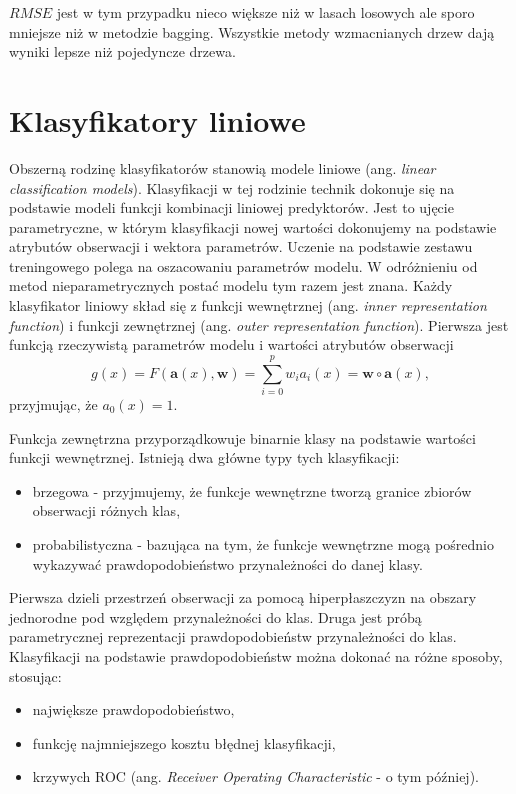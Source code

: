\documentclass[
]{book}
\providecommand{\tightlist}{%
  \setlength{\itemsep}{0pt}\setlength{\parskip}{0pt}}
\theoremstyle{plain}
\theoremstyle{definition}
\theoremstyle{definition}
\theoremstyle{definition}
\theoremstyle{definition}
\theoremstyle{definition}
\theoremstyle{remark}
\begin{document}
\(RMSE\) jest w tym przypadku nieco większe niż w lasach losowych ale sporo mniejsze niż w metodzie bagging. Wszystkie metody wzmacnianych drzew dają wyniki lepsze niż pojedyncze drzewa.

\chapter{Klasyfikatory liniowe}\label{klasyfikatory-liniowe}

Obszerną rodzinę klasyfikatorów stanowią modele liniowe (ang. \emph{linear classification models}). Klasyfikacji w tej rodzinie technik dokonuje się na podstawie modeli funkcji kombinacji liniowej predyktorów. Jest to ujęcie parametryczne, w którym klasyfikacji nowej wartości dokonujemy na podstawie atrybutów obserwacji i wektora parametrów. Uczenie na podstawie zestawu treningowego polega na oszacowaniu parametrów modelu. W odróżnieniu od metod nieparametrycznych postać modelu tym razem jest znana. Każdy klasyfikator liniowy skład się z funkcji wewnętrznej (ang. \emph{inner representation function}) i funkcji zewnętrznej (ang. \emph{outer representation function}).
Pierwsza jest funkcją rzeczywistą parametrów modelu i wartości atrybutów obserwacji
\begin{equation}
    g(x) = F(\mathbf{a}(x),\mathbf{w})=\sum_{i=0}^pw_ia_i(x)=\mathbf{w}\circ \mathbf{a}(x),
\end{equation}
przyjmując, że \(a_0(x)=1\).

Funkcja zewnętrzna przyporządkowuje binarnie klasy na podstawie wartości funkcji wewnętrznej. Istnieją dwa główne typy tych klasyfikacji:

\begin{itemize}
\tightlist
\item
  brzegowa - przyjmujemy, że funkcje wewnętrzne tworzą granice zbiorów obserwacji różnych klas,
\item
  probabilistyczna - bazująca na tym, że funkcje wewnętrzne mogą pośrednio wykazywać prawdopodobieństwo przynależności do danej klasy.
\end{itemize}

Pierwsza dzieli przestrzeń obserwacji za pomocą hiperpłaszczyzn na obszary jednorodne pod względem przynależności do klas. Druga jest próbą parametrycznej reprezentacji prawdopodobieństw przynależności do klas. Klasyfikacji na podstawie prawdopodobieństw można dokonać na różne sposoby, stosując:

\begin{itemize}
\tightlist
\item
  największe prawdopodobieństwo,
\item
  funkcję najmniejszego kosztu błędnej klasyfikacji,
\item
  krzywych ROC (ang. \emph{Receiver Operating Characteristic} - o tym później).
\end{itemize}
\end{document}

